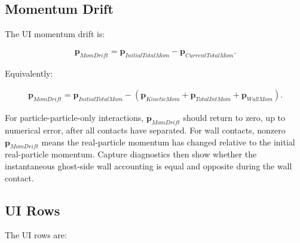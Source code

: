 \subsection{Momentum Drift}

The UI momentum drift is:

\begin{equation}
\begin{aligned}
\mathbf{p}_{MomDrift}
=
\mathbf{p}_{InitialTotalMom}
-
\mathbf{p}_{CurrentTotalMom}.
\end{aligned}
\end{equation}

Equivalently:

\begin{equation}
\begin{aligned}
\mathbf{p}_{MomDrift}
=
\mathbf{p}_{InitialTotalMom}
-
\left(
\mathbf{p}_{KineticMom}
+
\mathbf{p}_{TotalIntMom}
+
\mathbf{p}_{WallMom}
\right).
\end{aligned}
\end{equation}

For particle-particle-only interactions, \(\mathbf{p}_{MomDrift}\) should
return to zero, up to numerical error, after all contacts have separated.  For
wall contacts, nonzero \(\mathbf{p}_{MomDrift}\) means the real-particle
momentum has changed relative to the initial real-particle momentum.  Capture
diagnostics then show whether the instantaneous ghost-side wall accounting is
equal and opposite during the wall contact.

\subsection{UI Rows}

The UI rows are:

